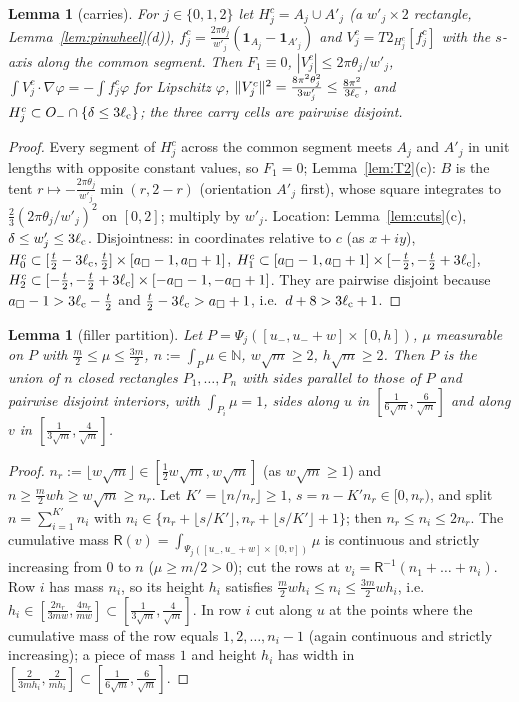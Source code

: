 \documentclass[11pt]{article}
\newtheorem{lemma}[theorem]{Lemma}
\theoremstyle{definition}
\theoremstyle{remark}
\newcommand{\N}{\mathbb N}
\newcommand{\dep}{\delta}
\newcommand{\lc}{\ell_{\rm c}}
\begin{document}
\begin{lemma}[carries]\label{lem:carry}
For $j\in\{0,1,2\}$ let $H^c_j=A_j\cup A'_j$ (a $w'_j\times2$ rectangle, Lemma~\ref{lem:pinwheel}(d)), $f^c_j=\frac{2\pi\theta_j}{w'_j}(\mathbf 1_{A_j}-\mathbf 1_{A'_j})$ and
$V^c_j=T2_{H^c_j}[f^c_j]$ with the $s$-axis along the common segment. Then $F_1\equiv0$, $|V^c_j|\le2\pi\theta_j/w'_j$,
$\int V^c_j\cdot\nabla\varphi=-\int f^c_j\varphi$ for Lipschitz $\varphi$, $\|V^c_j\|^2=\frac{8\pi^2\theta_j^2}{3w'_j}\le\frac{8\pi^2}{3\lc}$, and
$H^c_j\subset O_-\cap\{\dep\le3\lc\}$; the three carry cells are pairwise disjoint.
\end{lemma}
\begin{proof}
Every segment of $H^c_j$ across the common segment meets $A_j$ and $A'_j$ in unit lengths with opposite constant values, so $F_1=0$; Lemma~\ref{lem:T2}(c):
$B$ is the tent $r\mapsto-\frac{2\pi\theta_j}{w'_j}\min(r,2-r)$ (orientation $A'_j$ first), whose square integrates to $\frac23(2\pi\theta_j/w'_j)^2$ on $[0,2]$; multiply by
$w'_j$. Location: Lemma~\ref{lem:cuts}(c), $\dep\le w'_j\le3\lc$. Disjointness: in coordinates relative to $c$ (as $x+iy$),
$H^c_0\subset[\frac t2-3\lc,\frac t2]\times[a_\square-1,a_\square+1]$,
$H^c_1\subset[a_\square-1,a_\square+1]\times[-\frac t2,-\frac t2+3\lc]$,
$H^c_2\subset[-\frac t2,-\frac t2+3\lc]\times[-a_\square-1,-a_\square+1]$.
They are pairwise disjoint because $a_\square-1>3\lc-\frac t2$ and $\frac t2-3\lc>a_\square+1$, i.e.\ $d+8>3\lc+1$.
\end{proof}

\begin{lemma}[filler partition]\label{lem:fillpart}
Let $P=\Psi_j([u_-,u_-+w]\times[0,h])$, $\mu$ measurable on $P$ with $\frac m2\le\mu\le\frac{3m}2$, $n:=\int_P\mu\in\N$, $w\sqrt m\ge2$, $h\sqrt m\ge2$.
Then $P$ is the union of $n$ closed rectangles $P_1,\dots,P_n$ with sides parallel to those of $P$ and pairwise disjoint interiors, with $\int_{P_i}\mu=1$, sides along $u$
in $[\frac1{6\sqrt m},\frac6{\sqrt m}]$ and along $v$ in $[\frac1{3\sqrt m},\frac4{\sqrt m}]$.
\end{lemma}
\begin{proof}
$n_r:=\lfloor w\sqrt m\rfloor\in[\frac12w\sqrt m,w\sqrt m]$ (as $w\sqrt m\ge1$) and $n\ge\frac m2wh\ge w\sqrt m\ge n_r$. Let $K'=\lfloor n/n_r\rfloor\ge1$, $s=n-K'n_r\in[0,n_r)$,
and split $n=\sum_{i=1}^{K'}n_i$ with $n_i\in\{n_r+\lfloor s/K'\rfloor,n_r+\lfloor s/K'\rfloor+1\}$; then $n_r\le n_i\le2n_r$. The cumulative mass
$\mathsf R(v)=\int_{\Psi_j([u_-,u_-+w]\times[0,v])}\mu$ is continuous and strictly increasing from $0$ to $n$ ($\mu\ge m/2>0$); cut the rows at
$v_i=\mathsf R^{-1}(n_1+\dots+n_i)$. Row $i$ has mass $n_i$, so its height $h_i$ satisfies $\frac m2wh_i\le n_i\le\frac{3m}2wh_i$, i.e.\
$h_i\in[\frac{2n_r}{3mw},\frac{4n_r}{mw}]\subset[\frac1{3\sqrt m},\frac4{\sqrt m}]$. In row $i$ cut along $u$ at the points where the cumulative mass of the row equals
$1,2,\dots,n_i-1$ (again continuous and strictly increasing); a piece of mass $1$ and height $h_i$ has width in $[\frac2{3mh_i},\frac2{mh_i}]\subset[\frac1{6\sqrt m},\frac6{\sqrt m}]$.
\end{proof}
\end{document}
